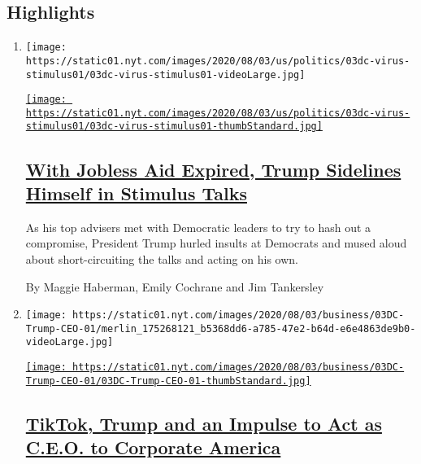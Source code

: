 \hypertarget{highlights}{%
\subsection{Highlights}\label{highlights}}

\begin{enumerate}
\def\labelenumi{\arabic{enumi}.}
\item
  \texttt{[image: https://static01.nyt.com/images/2020/08/03/us/politics/03dc-virus-stimulus01/03dc-virus-stimulus01-videoLarge.jpg]}

  \href{/2020/08/03/us/politics/congress-jobless-aid-talks-trump.html}{\texttt{[image: https://static01.nyt.com/images/2020/08/03/us/politics/03dc-virus-stimulus01/03dc-virus-stimulus01-thumbStandard.jpg]}}

  \hypertarget{with-jobless-aid-expired-trump-sidelines-himself-in-stimulus-talks}{%
  \subsection{\texorpdfstring{\href{/2020/08/03/us/politics/congress-jobless-aid-talks-trump.html}{With
  Jobless Aid Expired, Trump Sidelines Himself in Stimulus
  Talks}}{With Jobless Aid Expired, Trump Sidelines Himself in Stimulus Talks}}\label{with-jobless-aid-expired-trump-sidelines-himself-in-stimulus-talks}}

  As his top advisers met with Democratic leaders to try to hash out a
  compromise, President Trump hurled insults at Democrats and mused
  aloud about short-circuiting the talks and acting on his own.

  By Maggie Haberman, Emily Cochrane and Jim Tankersley
\item
  \texttt{[image: https://static01.nyt.com/images/2020/08/03/business/03DC-Trump-CEO-01/merlin\_175268121\_b5368dd6-a785-47e2-b64d-e6e4863de9b0-videoLarge.jpg]}

  \href{/2020/08/03/business/economy/trump-tiktok-china-business.html}{\texttt{[image: https://static01.nyt.com/images/2020/08/03/business/03DC-Trump-CEO-01/03DC-Trump-CEO-01-thumbStandard.jpg]}}

  \hypertarget{tiktok-trump-and-an-impulse-to-act-as-ceo-to-corporate-america}{%
  \subsection{\texorpdfstring{\href{/2020/08/03/business/economy/trump-tiktok-china-business.html}{TikTok,
  Trump and an Impulse to Act as C.E.O. to Corporate
  America}}{TikTok, Trump and an Impulse to Act as C.E.O. to Corporate America}}\label{tiktok-trump-and-an-impulse-to-act-as-ceo-to-corporate-america}}


\end{enumerate}
